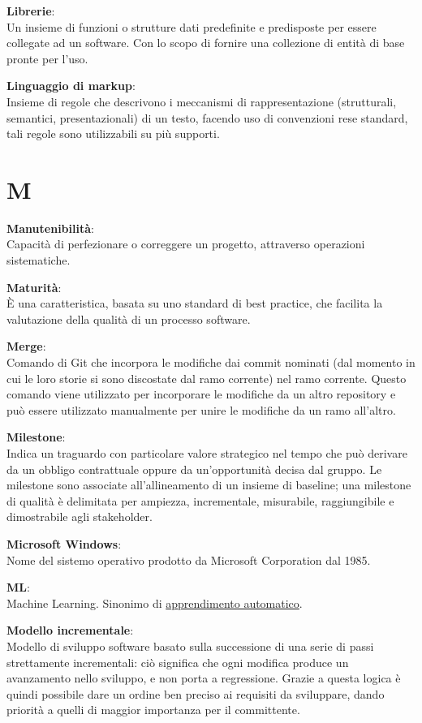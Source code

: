 \documentclass[a4paper, oneside, openany, dvipsnames, table]{article}
\begin{document}
\textbf{Librerie}:\\ Un insieme di funzioni o strutture dati predefinite e predisposte per essere collegate ad un software. Con lo scopo di fornire una collezione di entità di base pronte per l'uso.

\textbf{Linguaggio di markup}:\\  Insieme di regole che descrivono i meccanismi di rappresentazione (strutturali, semantici, presentazionali) di un testo, facendo uso di convenzioni rese standard, tali regole sono utilizzabili su più supporti.

\newpage
\section{M}
\textbf{Manutenibilità}:\\ Capacità di perfezionare o correggere un progetto, attraverso operazioni sistematiche.

\textbf{Maturità}:\\ È una caratteristica, basata su uno standard di best practice, che facilita la valutazione della qualità di un processo software. 

\textbf{Merge}:\\	Comando di Git che incorpora le modifiche dai commit nominati (dal momento in cui le loro storie si sono discostate dal ramo corrente) nel ramo corrente. Questo comando viene utilizzato per incorporare le modifiche da un altro repository e può essere utilizzato manualmente per unire le modifiche da un ramo all'altro.

\textbf{Milestone}:\\Indica un traguardo con particolare valore strategico nel tempo che può derivare da un obbligo contrattuale oppure da un'opportunità decisa dal gruppo. Le milestone sono associate all'allineamento di un insieme di baseline; una milestone di qualità è delimitata per ampiezza, incrementale, misurabile, raggiungibile e dimostrabile agli stakeholder.


\textbf{Microsoft Windows}:\\Nome del sistemo operativo prodotto da Microsoft Corporation dal 1985.

\textbf{ML}:\\Machine Learning. Sinonimo di \hyperref[par:appr_auto]{apprendimento automatico}.

\textbf{Modello incrementale}:\\Modello di sviluppo software basato sulla successione di una serie di passi strettamente incrementali: ciò significa che ogni modifica produce un avanzamento nello sviluppo, e non porta a regressione. Grazie a questa logica è quindi possibile dare un ordine ben preciso ai requisiti da sviluppare, dando priorità a quelli di maggior importanza per il committente.
\end{document}
